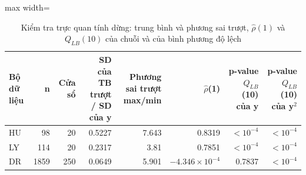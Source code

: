 \begin{table}[H]
\centering\small
\caption{Kiểm tra trực quan tính dừng: trung bình và phương sai trượt, $\hat\rho(1)$ và $Q_{LB}(10)$ của chuỗi và của bình phương độ lệch}\label{tab:tab_b11_01_stationarity}
\begin{adjustbox}{max width=\linewidth}
\begin{tabular}{lrrrrrrr}
\toprule
Bộ dữ liệu & n & Cửa sổ & SD của TB trượt / SD của y & Phương sai trượt max/min & $\hat{\rho}$(1) & p-value $Q_{LB}$(10) của y & p-value $Q_{LB}$(10) của y$^{2}$ \\
\midrule
HU & 98 & 20 & 0.5227 & 7.643 & 0.8319 & $<10^{-4}$ & $<10^{-4}$ \\
LY & 114 & 20 & 0.2317 & 3.81 & 0.7851 & $<10^{-4}$ & $<10^{-4}$ \\
DR & 1859 & 250 & 0.0649 & 5.901 & $-4.346\times10^{-4}$ & 0.7837 & $<10^{-4}$ \\
\bottomrule
\end{tabular}
\end{adjustbox}\par{}
\end{table}
